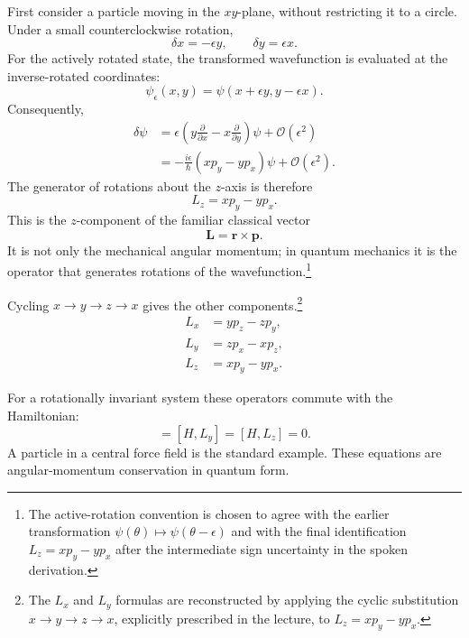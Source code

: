 First consider a particle moving in the \(xy\)-plane, without restricting it to a circle. Under a small counterclockwise rotation,
\begin{equation}
\delta x=-\epsilon y,
\qquad
\delta y=\epsilon x.
\end{equation}
For the actively rotated state, the transformed wavefunction is evaluated at the inverse-rotated coordinates:
\begin{equation}
\psi_\epsilon(x,y)
=\psi(x+\epsilon y,y-\epsilon x).
\end{equation}
Consequently,
\begin{align}
\delta\psi
&=\epsilon\left(
y\frac{\partial}{\partial x}
-x\frac{\partial}{\partial y}
\right)\psi
+\mathcal O(\epsilon^2)\\
&=-\frac{i\epsilon}{\hbar}
\left(xp_y-yp_x\right)\psi
+\mathcal O(\epsilon^2).
\end{align}
The generator of rotations about the \(z\)-axis is therefore
\begin{equation}
L_z=xp_y-yp_x.
\end{equation}
This is the \(z\)-component of the familiar classical vector
\begin{equation}
\mathbf L=\mathbf r\times\mathbf p.
\end{equation}
It is not only the mechanical angular momentum; in quantum mechanics it is the operator that generates rotations of the wavefunction.\footnote{The active-rotation convention is chosen to agree with the earlier transformation \(\psi(\theta)\mapsto\psi(\theta-\epsilon)\) and with the final identification \(L_z=xp_y-yp_x\) after the intermediate sign uncertainty in the spoken derivation.}

Cycling \(x\to y\to z\to x\) gives the other components.\footnote{The \(L_x\) and \(L_y\) formulas are reconstructed by applying the cyclic substitution \(x\to y\to z\to x\), explicitly prescribed in the lecture, to \(L_z=xp_y-yp_x\).}
\begin{align}
L_x&=yp_z-zp_y,\\
L_y&=zp_x-xp_z,\\
L_z&=xp_y-yp_x.
\end{align}

For a rotationally invariant system these operators commute with the Hamiltonian:
\begin{equation}
[H,L_x]=[H,L_y]=[H,L_z]=0.
\end{equation}
A particle in a central force field is the standard example. These equations are angular-momentum conservation in quantum form.


